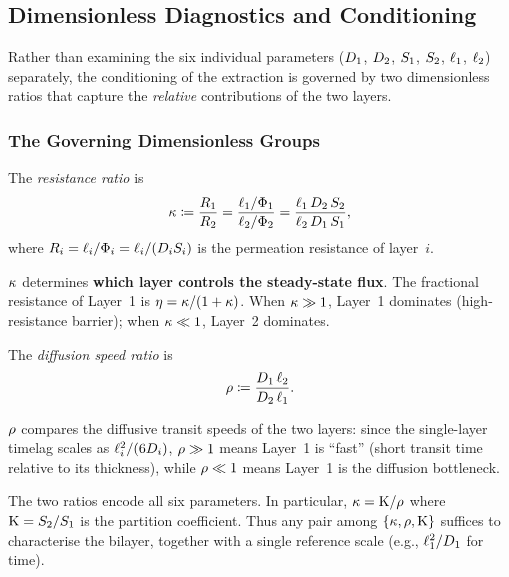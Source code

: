 \subsection{Dimensionless Diagnostics and Conditioning}
\label{sec:conditioning}

Rather than examining the six individual parameters ($D_{1}$, $D_{2}$,
$S_{1}$, $S_{2}$, $\ell_{1}$, $\ell_{2}$) separately, the conditioning of the
extraction is governed by two dimensionless ratios that capture the
\emph{relative} contributions of the two layers.

\subsubsection{The Governing Dimensionless Groups}

\begin{definition}
\label{def:kappa}
The \emph{resistance ratio} is
\begin{equation}
  \label{eq:kappa-def}
  \kappa \coloneqq \frac{R_1}{R_2}
  = \frac{\ell_{1}/\Phi_1}{\ell_{2}/\Phi_2}
  = \frac{\ell_{1}\,D_{2}\,S_{2}}{\ell_{2}\,D_{1}\,S_{1}},
\end{equation}
where $R_i = \ell_{i}/\Phi_i = \ell_{i}/(D_{i}S_{i})$ is the permeation
resistance of layer~$i$.
\end{definition}

$\kappa$ determines \textbf{which layer controls the steady-state flux}.
The fractional resistance of Layer~1 is $\eta = \kappa/(1+\kappa)$.
When $\kappa \gg 1$, Layer~1 dominates (high-resistance barrier);
when $\kappa \ll 1$, Layer~2 dominates.

\begin{definition}
\label{def:rho}
The \emph{diffusion speed ratio} is
\begin{equation}
  \label{eq:rho-def}
  \rho \coloneqq \frac{D_{1}\,\ell_{2}}{D_{2}\,\ell_{1}}.
\end{equation}
\end{definition}

$\rho$ compares the diffusive transit speeds of the two layers:
since the single-layer timelag scales as $\ell_{i}^2/(6D_{i})$,
$\rho \gg 1$ means Layer~1 is ``fast'' (short transit time relative to its
thickness), while $\rho \ll 1$ means Layer~1 is the diffusion bottleneck.

\begin{remark}
The two ratios encode all six parameters.  In particular,
$\kappa = \mathrm{K}/\rho$ where $\mathrm{K} = S_{2}/S_{1}$ is the partition
coefficient.  Thus any pair among $\{\kappa, \rho, \mathrm{K}\}$ suffices
to characterise the bilayer, together with a single reference scale
(e.g., $\ell_{1}^2/D_{1}$ for time).
\end{remark}


